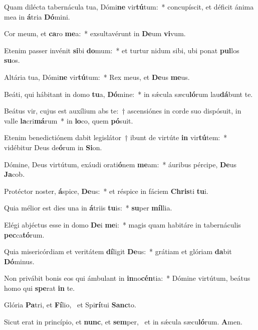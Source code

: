 \item Quam dilécta tabernácula tua, Dómi\textbf{ne} vir\textbf{tú}tum:~* concupíscit, et déficit ánima mea in \textbf{á}tria \textbf{Dó}mini.
\item Cor meum, et \textbf{ca}ro \textbf{me}a:~* exsultavérunt in \textbf{De}um \textbf{vi}vum.
\item Etenim passer invénit \textbf{si}bi \textbf{do}mum:~* et turtur nidum sibi, ubi ponat \textbf{pul}los \textbf{su}os.
\item Altária tua, Dómi\textbf{ne} vir\textbf{tú}tum:~* Rex meus, et \textbf{De}us \textbf{me}us.
\item Beáti, qui hábitant in domo \textbf{tu}a, \textbf{Dó}mine:~* in sǽcula sæcu\textbf{ló}rum lau\textbf{dá}bunt te.
\item Beátus vir, cujus est auxílium abs te:~† ascensiónes in corde suo dispósuit, in valle \textbf{la}cri\textbf{má}rum~* in \textbf{lo}co, quem \textbf{pó}suit.
\item Etenim benedictiónem dabit legislátor~† ibunt de virtúte \textbf{in} vir\textbf{tú}tem:~* vidébitur Deus de\textbf{ó}rum in \textbf{Si}on.
\item Dómine, Deus virtútum, exáudi orati\textbf{ó}nem \textbf{me}am:~* áuribus pércipe, \textbf{De}us \textbf{Ja}cob.
\item Protéctor noster, \textbf{á}spice, \textbf{De}us:~* et réspice in fáciem \textbf{Chris}ti \textbf{tu}i.
\item Quia mélior est dies una in \textbf{á}triis \textbf{tu}is:~* \textbf{su}per \textbf{míl}lia.
\item Elégi abjéctus esse in domo \textbf{De}i \textbf{me}i:~* magis quam habitáre in tabernáculis \textbf{pec}ca\textbf{tó}rum.
\item Quia misericórdiam et veritátem \textbf{dí}ligit \textbf{De}us:~* grátiam et glóriam \textbf{da}bit \textbf{Dó}minus.
\item Non privábit bonis eos qui ámbulant in \textbf{in}no\textbf{cén}tia:~* Dómine virtútum, beátus homo qui \textbf{spe}rat \textbf{in} te.
\item Glória \textbf{Pa}tri, et \textbf{Fí}lio,~\psstar{} et Spi\textbf{rí}tui \textbf{Sanc}to.
\item Sicut erat in princípio, et \textbf{nunc}, et \textbf{sem}per,~\psstar{} et in sǽcula sæcu\textbf{ló}rum. \textbf{A}men.
